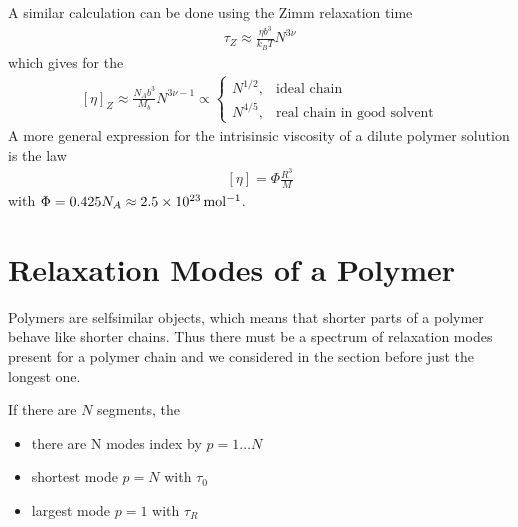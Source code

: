 \documentclass[letterpaper,10pt,english]{sphinxmanual}
\begin{document}
\sphinxAtStartPar
A similar calculation can be done using the Zimm relaxation time
\begin{equation*}
\begin{split}\tau_{Z} \approx \frac{\eta b^{3}}{k_{B} T} N^{3 \nu}\end{split}
\end{equation*}
\sphinxAtStartPar
which gives for the 
\begin{equation*}
\begin{split}[\eta]_Z \approx \frac{N_A b^3}{M_b}N^{3\nu-1}\propto
\begin{cases}
N^{1/2}, & \text{ideal chain}\\
N^{4/5},  & \text{real chain in good solvent}
\end{cases}\end{split}
\end{equation*}
\sphinxAtStartPar
A more general expression for the intrisinsic viscosity of a dilute polymer solution is the  law
\begin{equation*}
\begin{split}[\eta]=\Phi \frac{R^3}{M}\end{split}
\end{equation*}
\sphinxAtStartPar
with \(\Phi=0.425 N_A\approx 2.5\times 10^{23}\, {\rm mol^{-1}}\).

\sphinxAtStartPar
{}


\section{Relaxation Modes of a Polymer}
\label{\detokenize{notebooks/L25/1_polymer_dynamics:Relaxation-Modes-of-a-Polymer}}
\sphinxAtStartPar
Polymers are self\sphinxhyphen{}similar objects, which means that shorter parts of a polymer behave like shorter chains. Thus there must be a spectrum of relaxation modes present for a polymer chain and we considered in the section before just the longest one.

\sphinxAtStartPar
If there are \(N\) segments, the
\begin{itemize}
\item {} 
\sphinxAtStartPar
there are N modes index by \(p=1\ldots N\)

\item {} 
\sphinxAtStartPar
shortest mode \(p=N\) with \(\tau_0\)

\item {} 
\sphinxAtStartPar
largest mode \(p=1\) with \(\tau_R\)

\end{itemize}
\end{document}
